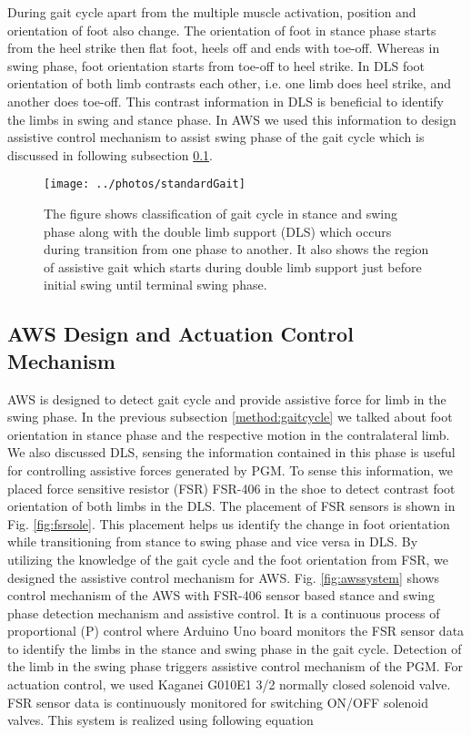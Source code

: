 \documentclass[letterpaper, 10 pt, conference]{ieeeconf}  %
\begin{document}
During gait cycle apart from the multiple muscle activation, position and orientation of foot also change. The orientation of foot in stance phase starts from the heel strike then flat foot, heels off and ends with toe-off. Whereas in swing phase, foot orientation starts from toe-off to heel strike. In DLS foot orientation of both limb contrasts each other, i.e. one limb does heel strike, and another does toe-off. This contrast information in DLS is beneficial to identify the limbs in swing and stance phase. In AWS we used this information to design assistive control mechanism to assist swing phase of the gait cycle which is discussed in following subsection \ref{method:awscontrol}.

\begin{figure}
	\centering
	\texttt{[image: ../photos/standardGait]}
	\caption{The figure shows classification of gait cycle in stance and swing phase along with the double limb support (DLS) which occurs during transition from one phase to another. It also shows the region of assistive gait which starts during double limb support just before initial swing until terminal swing phase.}
	\label{fig:standardgait}
\end{figure}

\subsection{AWS Design and Actuation Control Mechanism} \label{method:awscontrol}

AWS is designed to detect gait cycle and provide assistive force for limb in the swing phase. In the previous subsection \ref{method:gaitcycle} we talked about foot orientation in stance phase and the respective motion in the contralateral limb. We also discussed DLS, sensing the information contained in this phase is useful for controlling assistive forces generated by PGM. To sense this information, we placed force sensitive resistor (FSR) FSR-406 in the shoe to detect contrast foot orientation of both limbs in the DLS. The placement of FSR sensors is shown in Fig. \ref{fig:fsrsole}. This placement helps us identify the change in foot orientation while transitioning from stance to swing phase and vice versa in DLS. By utilizing the knowledge of the gait cycle and the foot orientation from FSR, we designed the assistive control mechanism for AWS. Fig. \ref{fig:awssystem} shows control mechanism of the AWS with FSR-406 sensor based stance and swing phase detection mechanism and assistive control. It is a continuous process of proportional (P) control where Arduino Uno board monitors the FSR sensor data to identify the limbs in the stance and swing phase in the gait cycle. Detection of the limb in the swing phase triggers assistive control mechanism of the PGM. For actuation control, we used Kaganei G010E1 3/2 normally closed solenoid valve. FSR sensor data is continuously monitored for switching ON/OFF solenoid valves. This system is realized using following equation
\end{document}
